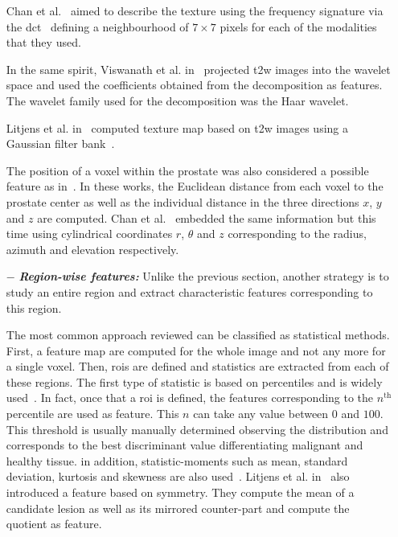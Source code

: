 \begin{enumerate}[leftmargin=*]
  Chan et al.~\cite{Chan2003} aimed to describe the texture using the frequency signature via the \acf{dct}~\cite{Ahmed1974} defining a neighbourhood of $7 \times 7$ pixels for each of the modalities that they used.

  In the same spirit, Viswanath et al. in~\cite{Viswanath2012} projected \ac{t2w} images into the wavelet space and used the coefficients obtained from the decomposition as features. The wavelet family used for the decomposition was the Haar wavelet.

  Litjens et al. in~\cite{Litjens2014} computed texture map based on \ac{t2w} images using a Gaussian filter bank~\cite{Leung2001}.

  The position of a voxel within the prostate was also considered a possible feature as in~\cite{Litjens2011,Litjens2014}. In these works, the Euclidean distance from each voxel to the prostate center as well as the individual distance in the three directions $x$, $y$ and $z$ are computed. Chan et al.~\cite{Chan2003} embedded the same information but this time using cylindrical coordinates $r$, $\theta$ and $z$ corresponding to the radius, azimuth and elevation respectively.

\item[$-$] \textbf{\textit{Region-wise features:}} Unlike the previous section, another strategy is to study an entire region and extract characteristic features corresponding to this region.

  The most common approach reviewed can be classified as statistical methods. First, a feature map are computed for the whole image and not any more for a single voxel. Then, \acp{roi} are defined and statistics are extracted from each of these regions. The first type of statistic is based on percentiles and is widely used~\cite{Antic2013,Litjens2011,Litjens2012,Litjens2014,Peng2013,Tiwari2009a,Tiwari2010,Tiwari2013,Viswanath2008,Viswanath2008a,Viswanath2011,Viswanath2012,Vos2008,Vos2008a,Vos2010,Vos2012}. In fact, once that a \ac{roi} is defined, the features corresponding to the $n^{\text{th}}$ percentile are used as feature. This $n$ can take any value between $0$ and $100$. This threshold is usually manually determined observing the distribution and corresponds to the best discriminant value differentiating malignant and healthy tissue. in addition, statistic-moments such as mean, standard deviation, kurtosis and skewness are also used~\cite{Ampeliotis2007,Ampeliotis2008,Antic2013,Niaf2011,Niaf2012,Peng2013}. Litjens et al. in~\cite{Litjens2014} also introduced a feature based on symmetry. They compute the mean of a candidate lesion as well as its mirrored counter-part and compute the quotient as feature.


\end{enumerate}
